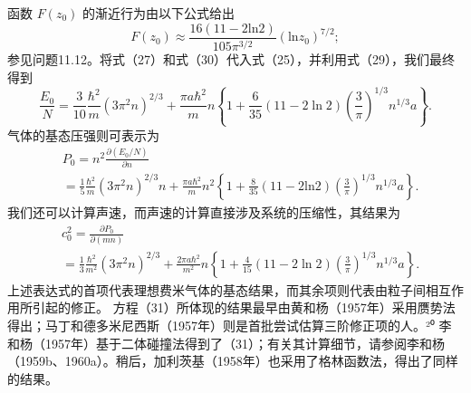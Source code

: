 函数 \(F(z_0)\) 的渐近行为由以下公式给出
\begin{equation}\tag{11.6.39}\label{eq:11.6.39}
F ( z _ { 0 } ) \approx \frac { 16 ( 11 - 2 \mathrm { l n } 2 ) } { 10 5 \pi ^{3 / 2} } ( \mathrm { l n } z _ { 0 } ) ^{7 / 2} ;
\end{equation}
参见问题11.12。将式（27）和式（30）代入式（25），并利用式（29），我们最终得到
\begin{equation}\tag{11.6.40}\label{eq:11.6.40}
\frac { E _ { 0 } } { N } = \frac { 3 } { 10 } \frac { \hbar ^{2} } { m } ( 3 \pi ^{2} n ) ^{2 / 3} + \frac { \pi a \hbar ^{2} } { m } n \left\{ 1 + \frac { 6 } { 35 } ( 11 - 2 \ln 2 ) \left( \frac { 3 } { \pi } \right) ^{1 / 3} n ^{1 / 3} a \right\} .
\end{equation}
气体的基态压强则可表示为
\begin{equation}\tag{11.6.41}\label{eq:11.6.41}
\begin{array}{rl} & { P _ { 0 } = n ^{2} \frac { \partial ( E _ { 0 } / N ) } { \partial n } } \\& {  = \frac { 1 } { 5 } \frac { \hbar ^{2} } { m } ( 3 \pi ^{2} n ) ^{2 / 3} n + \frac { \pi a \hbar ^{2} } { m } n ^{2} \left\{ 1 + \frac { 8 } { 35 } ( 11 - 2 \mathrm { l n } 2 ) \left( \frac { 3 } { \pi } \right) ^{1 / 3} n ^{1 / 3} a \right\} . } \end{array}
\end{equation}
我们还可以计算声速，而声速的计算直接涉及系统的压缩性，其结果为
\begin{equation}\tag{11.6.42}\label{eq:11.6.42}
\begin{array}{rl} & { c _ { 0 } ^{2} = \frac { \partial P _ { 0 } } { \partial ( m n ) } } \\& {  = \frac { 1 } { 3 } \frac { \hbar ^{2} } { m ^{2} } ( 3 \pi ^{2} n ) ^{2 / 3} + \frac { 2 \pi a \hbar ^{2} } { m ^{2} } n \left\{ 1 + \frac { 4 } { 15 } ( 11 - 2 \ln 2 ) \left( \frac { 3 } { \pi } \right) ^{1 / 3} n ^{1 / 3} a \right\} . } \end{array}
\end{equation}
上述表达式的首项代表理想费米气体的基态结果，而其余项则代表由粒子间相互作用所引起的修正。
方程（31）所体现的结果最早由黄和杨（1957年）采用赝势法得出；马丁和德多米尼西斯（1957年）则是首批尝试估算三阶修正项的人。²⁰ 李和杨（1957年）基于二体碰撞法得到了（31）；有关其计算细节，请参阅李和杨（1959b、1960a）。稍后，加利茨基（1958年）也采用了格林函数法，得出了同样的结果。
